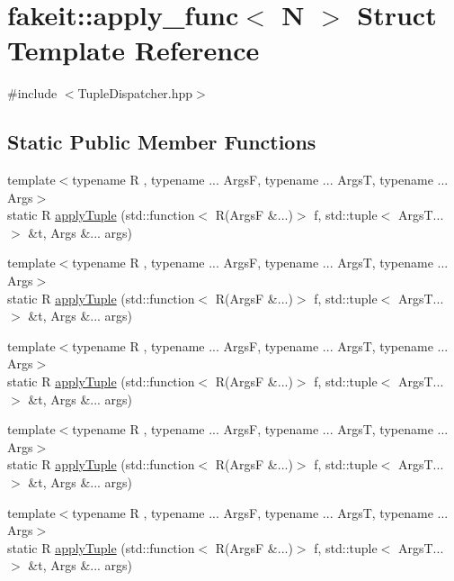 \hypertarget{structfakeit_1_1apply__func}{}\section{fakeit\+::apply\+\_\+func$<$ N $>$ Struct Template Reference}
\label{structfakeit_1_1apply__func}


{\ttfamily \#include $<$Tuple\+Dispatcher.\+hpp$>$}

\subsection*{Static Public Member Functions}
\begin{DoxyCompactItemize}
\item 
{\footnotesize template$<$typename R , typename ... ArgsF, typename ... ArgsT, typename ... Args$>$ }\\static R \mbox{\hyperlink{structfakeit_1_1apply__func_a89d97e5fe47d2293248f1832a6ebd14f}{apply\+Tuple}} (std\+::function$<$ R(ArgsF \&...)$>$ f, std\+::tuple$<$ Args\+T... $>$ \&t, Args \&... args)
\item 
{\footnotesize template$<$typename R , typename ... ArgsF, typename ... ArgsT, typename ... Args$>$ }\\static R \mbox{\hyperlink{structfakeit_1_1apply__func_a89d97e5fe47d2293248f1832a6ebd14f}{apply\+Tuple}} (std\+::function$<$ R(ArgsF \&...)$>$ f, std\+::tuple$<$ Args\+T... $>$ \&t, Args \&... args)
\item 
{\footnotesize template$<$typename R , typename ... ArgsF, typename ... ArgsT, typename ... Args$>$ }\\static R \mbox{\hyperlink{structfakeit_1_1apply__func_a89d97e5fe47d2293248f1832a6ebd14f}{apply\+Tuple}} (std\+::function$<$ R(ArgsF \&...)$>$ f, std\+::tuple$<$ Args\+T... $>$ \&t, Args \&... args)
\item 
{\footnotesize template$<$typename R , typename ... ArgsF, typename ... ArgsT, typename ... Args$>$ }\\static R \mbox{\hyperlink{structfakeit_1_1apply__func_a89d97e5fe47d2293248f1832a6ebd14f}{apply\+Tuple}} (std\+::function$<$ R(ArgsF \&...)$>$ f, std\+::tuple$<$ Args\+T... $>$ \&t, Args \&... args)
\item 
{\footnotesize template$<$typename R , typename ... ArgsF, typename ... ArgsT, typename ... Args$>$ }\\static R \mbox{\hyperlink{structfakeit_1_1apply__func_a89d97e5fe47d2293248f1832a6ebd14f}{apply\+Tuple}} (std\+::function$<$ R(ArgsF \&...)$>$ f, std\+::tuple$<$ Args\+T... $>$ \&t, Args \&... args)

\end{DoxyCompactItemize}
